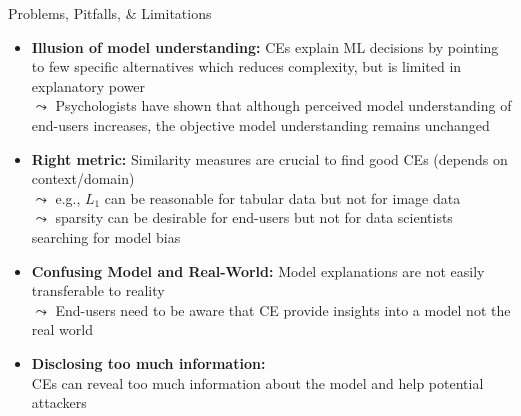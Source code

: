 \documentclass[10pt,compress,t,notes=noshow, xcolor=table]{beamer}
\begin{document}
\begin{frame}{Problems, Pitfalls, \& Limitations}
\begin{itemize}[<+->]
    \item \textbf{Illusion of model understanding:} 
    CEs explain ML decisions by pointing to few specific alternatives which reduces complexity, but is limited in explanatory power\\
    $\leadsto$ %
    Psychologists have shown that although perceived model understanding of end-users increases, the objective model understanding remains unchanged
    
    \item \textbf{Right metric:} Similarity measures are crucial to find good CEs (depends on context/domain)\\
    $\leadsto$ e.g., $L_1$ can be reasonable for tabular data but not for image data\\
    $\leadsto$ sparsity can be desirable for end-users but not for data scientists searching for model bias

    \item \textbf{Confusing Model and Real-World:} Model explanations are not easily transferable to reality\\
    $\leadsto$ End-users need to be aware that CE provide insights into a model not the real world %
    \item \textbf{Disclosing too much information:} \\
    CEs can reveal too much information about the model and help potential attackers
    \end{itemize}
\end{frame}
\end{document}
